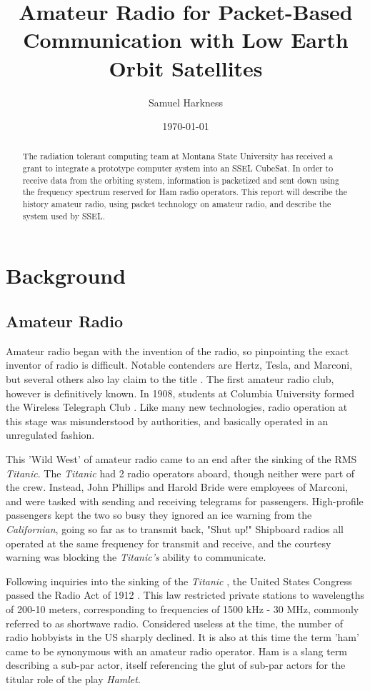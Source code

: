 \documentclass[letter,12pt]{article}
\title{Amateur Radio for Packet-Based Communication with Low Earth Orbit Satellites}
\author{Samuel Harkness}
\date{\mydate\today}
\begin{document}
\maketitle

\begin{abstract}
	The radiation tolerant computing team at Montana State University has received a grant to integrate a prototype computer system into an SSEL CubeSat.  In order to receive data from the orbiting system, information is packetized and sent down using the frequency spectrum reserved for Ham radio operators. This report will describe the history amateur radio, using packet technology on amateur radio, and describe the system used by SSEL.
\end{abstract}

\section{Background}	
	\subsection{Amateur Radio}
		Amateur radio began with the invention of the radio, so pinpointing the exact inventor of radio is difficult.  Notable contenders are Hertz, Tesla, and Marconi, but several others also lay claim to the title \cite{Bishop_05}.  The first amateur radio club, however is definitively known.  In 1908, students at Columbia University formed the Wireless Telegraph Club \cite{Sun_08}. Like many new technologies, radio operation at this stage was misunderstood by authorities, and basically operated in an unregulated fashion.
		
		This 'Wild West' of amateur radio came to an end after the sinking of the RMS \textit{Titanic}.  The \textit{Titanic} had 2 radio operators aboard, though neither were part of the crew.  Instead, John Phillips and Harold Bride were employees of Marconi, and were tasked with sending and receiving telegrams for passengers.  High-profile passengers kept the two so busy they ignored an ice warning from the \textit{Californian}, going so far as to transmit back, "Shut up!" Shipboard radios all operated at the same frequency for transmit and receive, and the courtesy warning was blocking the \textit{Titanic's} ability to communicate. \cite{Coughlan_12}
		
		Following inquiries into the sinking of the \textit{Titanic} \cite{Titanic_12}, the United States Congress passed the Radio Act of 1912 \cite{Radio_12}. This law restricted private stations to wavelengths of 200-10 meters, corresponding to frequencies of 1500 kHz - 30 MHz, commonly referred to as shortwave radio. Considered useless at the time, the number of radio hobbyists in the US sharply declined. It is also at this time the term 'ham' came to be synonymous with an amateur radio operator.  Ham is a slang term describing a sub-par actor, itself referencing the glut of sub-par actors for the titular role of the play \textit{Hamlet}.
		
\end{document}

